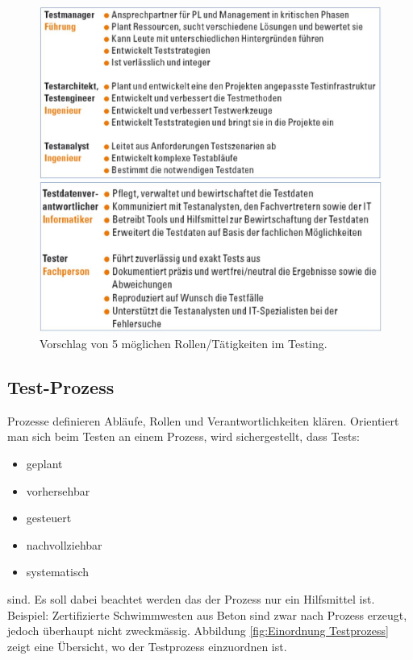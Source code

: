 \begin{figure}
\centering
\begin{minipage}{.47\textwidth}
  \centering
  \includegraphics[width=1\linewidth]{02/bilder/Taetigkeiten Testing 1.JPG}
\end{minipage}%
\begin{minipage}{.53\textwidth}
  \centering
  \includegraphics[width=1\linewidth]{02/bilder/Taetigkeiten Testing 2.JPG}
\end{minipage}
	\caption{Vorschlag von 5 möglichen Rollen/Tätigkeiten im Testing.}
	\label{fig:Rollen im Testing}
\end{figure}

\subsection{Test-Prozess}

Prozesse definieren Abläufe, Rollen und Verantwortlichkeiten klären. Orientiert man sich beim Testen an einem Prozess, wird sichergestellt, dass Tests:
\begin{itemize}
    \item geplant
    \item vorhersehbar
    \item gesteuert
    \item nachvollziehbar
    \item systematisch
\end{itemize}
sind. Es soll dabei beachtet werden das der Prozess nur ein Hilfsmittel ist. Beispiel: Zertifizierte Schwimmwesten aus Beton sind zwar nach Prozess erzeugt, jedoch überhaupt nicht zweckmässig. Abbildung \ref{fig:Einordnung Testprozess} zeigt eine Übersicht, wo der Testprozess einzuordnen ist.

